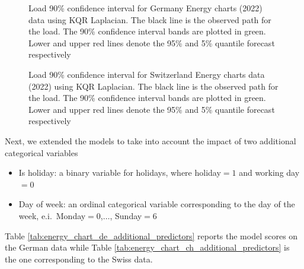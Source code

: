     \begin{figure}[!ht]
        \caption[Probabilistic forecast for load in Germany]{Load 90\% confidence interval for Germany Energy charts (2022) data using KQR Laplacian. The black line is the observed path for the load. The 90\% confidence interval bands are plotted in green. Lower and upper red lines denote the 95\% and 5\% quantile forecast respectively}
        \label{fig:DE_load_CI}
    \end{figure}
    

    \begin{figure}[!ht]
        \caption[Probabilistic forecast for load in Switzerland]{Load 90\% confidence interval for Switzerland Energy charts data (2022) using KQR Laplacian. The black line is the observed path for the load. The 90\% confidence interval bands are plotted in green. Lower and upper red lines denote the 95\% and 5\% quantile forecast respectively}
        \label{fig:CH_load_CI}
    \end{figure}
    
Next, we extended the models to take into account the impact of two additional categorical variables
\begin{itemize}
    \item Is holiday: a binary variable for holidays, where holiday$=1$ and working day$=0$
    \item Day of week: an ordinal categorical variable corresponding to the day of the week, e.i.\ Monday$=0$,$\dots$, Sunday$=6$
\end{itemize}
Table \ref{tab:energy_chart_de_additional_predictors} reports the model scores on the German data while Table \ref{tab:energy_chart_ch_additional_predictors} is the one corresponding to the Swiss data.

